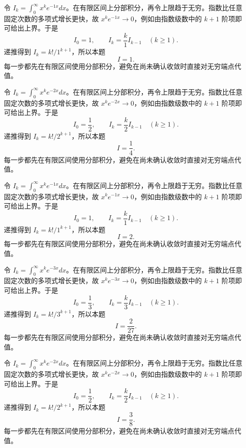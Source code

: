 \documentclass[12pt,fontset=fandol]{ctexart}
\begin{document}
\begin{solve}\label{ans:c19q20}
令 $I_k=\int_0^\infty x^ke^{-1x}dx$。在有限区间上分部积分，再令上限趋于无穷。指数比任意固定次数的多项式增长更快，故 $x^ke^{-1x}\to0$，例如由指数级数中的 $k+1$ 阶项即可给出上界。于是
\[
I_0=1,\qquad I_k=\frac k{1}I_{k-1}\quad(k\ge1).
\]
递推得到 $I_k=k!/1^{k+1}$，所以本题
\[
I=1.
\]
每一步都先在有限区间使用分部积分，避免在尚未确认收敛时直接对无穷端点代值。
\end{solve}

\begin{solve}\label{ans:c19q21}
令 $I_k=\int_0^\infty x^ke^{-2x}dx$。在有限区间上分部积分，再令上限趋于无穷。指数比任意固定次数的多项式增长更快，故 $x^ke^{-2x}\to0$，例如由指数级数中的 $k+1$ 阶项即可给出上界。于是
\[
I_0=\frac{1}{2},\qquad I_k=\frac k{2}I_{k-1}\quad(k\ge1).
\]
递推得到 $I_k=k!/2^{k+1}$，所以本题
\[
I=\frac{1}{4}.
\]
每一步都先在有限区间使用分部积分，避免在尚未确认收敛时直接对无穷端点代值。
\end{solve}

\begin{solve}\label{ans:c19q22}
令 $I_k=\int_0^\infty x^ke^{-1x}dx$。在有限区间上分部积分，再令上限趋于无穷。指数比任意固定次数的多项式增长更快，故 $x^ke^{-1x}\to0$，例如由指数级数中的 $k+1$ 阶项即可给出上界。于是
\[
I_0=1,\qquad I_k=\frac k{1}I_{k-1}\quad(k\ge1).
\]
递推得到 $I_k=k!/1^{k+1}$，所以本题
\[
I=2.
\]
每一步都先在有限区间使用分部积分，避免在尚未确认收敛时直接对无穷端点代值。
\end{solve}

\begin{solve}\label{ans:c19q23}
令 $I_k=\int_0^\infty x^ke^{-3x}dx$。在有限区间上分部积分，再令上限趋于无穷。指数比任意固定次数的多项式增长更快，故 $x^ke^{-3x}\to0$，例如由指数级数中的 $k+1$ 阶项即可给出上界。于是
\[
I_0=\frac{1}{3},\qquad I_k=\frac k{3}I_{k-1}\quad(k\ge1).
\]
递推得到 $I_k=k!/3^{k+1}$，所以本题
\[
I=\frac{2}{27}.
\]
每一步都先在有限区间使用分部积分，避免在尚未确认收敛时直接对无穷端点代值。
\end{solve}

\begin{solve}\label{ans:c19q24}
令 $I_k=\int_0^\infty x^ke^{-2x}dx$。在有限区间上分部积分，再令上限趋于无穷。指数比任意固定次数的多项式增长更快，故 $x^ke^{-2x}\to0$，例如由指数级数中的 $k+1$ 阶项即可给出上界。于是
\[
I_0=\frac{1}{2},\qquad I_k=\frac k{2}I_{k-1}\quad(k\ge1).
\]
递推得到 $I_k=k!/2^{k+1}$，所以本题
\[
I=\frac{3}{8}.
\]
每一步都先在有限区间使用分部积分，避免在尚未确认收敛时直接对无穷端点代值。
\end{solve}
\end{document}
